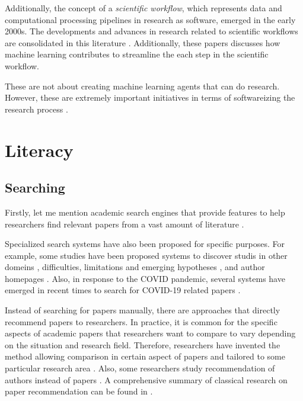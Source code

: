 \documentclass{book}
\begin{document}
Additionally, the concept of a \textit{scientific workflow}, which represents data and computational processing pipelines in research as software, emerged in the early 2000s. The developments and advances in research related to scientific workflows are consolidated in this literature \cite{barker2008scientific,atkinson2017scientific}. Additionally, these papers \cite{deelman2019role,nouri2021exploring} discusses how machine learning contributes to streamline the each step in the scientific workflow.

These are not about creating machine learning agents that can do research. However, these are extremely important initiatives in terms of softwareizing the research process \cite{deelman2015pegasus,gil2011semantic}.

\section{Literacy}

\subsection{Searching}

Firstly, let me mention academic search engines that provide features to help researchers find relevant papers from a vast amount of literature \cite{googlescholar,semanticscholar,dblp,pubmed,citeseerx}. 

Specialized search systems have also been proposed for specific purposes. For example, some studies have been proposed systems to discover studis in other domeins \cite{kang2022augmenting}, difficulties, limitations and emerging hypotheses \cite{lahav2022search}, and author homepages \cite{patel2021author}. Also, in response to the COVID pandemic, several systems have emerged in recent times to search for COVID-19 related papers \cite{hope2020scisight}.

Instead of searching for papers manually, there are approaches that directly recommend papers to researchers. In practice, it is common for the specific aspects of academic papers that researchers want to compare to vary depending on the situation and research field. Therefore, researchers have invented the method allowing comparison in certain aspect of papers \cite{ostendorff2020aspect} and tailored to some particular research area \cite{breitinger2022recommending}. Also, some researchers study recommendation of authors instead of papers \cite{portenoy2022bursting}. A comprehensive summary of classical research on paper recommendation can be found in \cite{bai2019scientific}.
\end{document}
